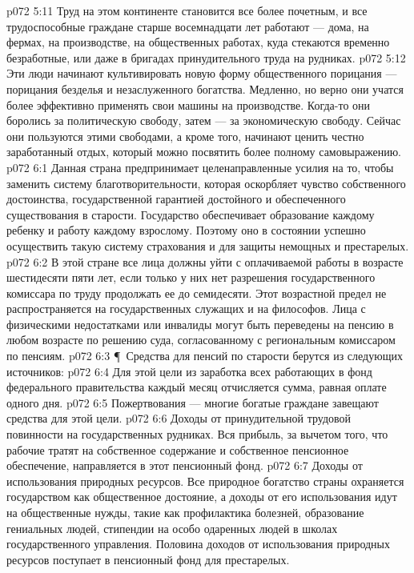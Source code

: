 \vs p072 5:11 Труд на этом континенте становится все более почетным, и все трудоспособные граждане старше восемнадцати лет работают --- дома, на фермах, на производстве, на общественных работах, куда стекаются временно безработные, или даже в бригадах принудительного труда на рудниках.
\vs p072 5:12 Эти люди начинают культивировать новую форму общественного порицания --- порицания безделья и незаслуженного богатства. Медленно, но верно они учатся более эффективно применять свои машины на производстве. Когда\hyp{}то они боролись за политическую свободу, затем --- за экономическую свободу. Сейчас они пользуются этими свободами, а кроме того, начинают ценить честно заработанный отдых, который можно посвятить более полному самовыражению.
\vs p072 6:1 Данная страна предпринимает целенаправленные усилия на то, чтобы заменить систему благотворительности, которая оскорбляет чувство собственного достоинства, государственной гарантией достойного и обеспеченного существования в старости. Государство обеспечивает образование каждому ребенку и работу каждому взрослому. Поэтому оно в состоянии успешно осуществить такую систему страхования и для защиты немощных и престарелых.
\vs p072 6:2 В этой стране все лица должны уйти с оплачиваемой работы в возрасте шестидесяти пяти лет, если только у них нет разрешения государственного комиссара по труду продолжать ее до семидесяти. Этот возрастной предел не распространяется на государственных служащих и на философов. Лица с физическими недостатками или инвалиды могут быть переведены на пенсию в любом возрасте по решению суда, согласованному с региональным комиссаром по пенсиям.
\vs p072 6:3 \P\ Средства для пенсий по старости берутся из следующих источников:
\vs p072 6:4 \bibnobreakspace Для этой цели из заработка всех работающих в фонд федерального правительства каждый месяц отчисляется сумма, равная оплате одного дня.
\vs p072 6:5 \bibnobreakspace Пожертвования --- многие богатые граждане завещают средства для этой цели.
\vs p072 6:6 \bibnobreakspace Доходы от принудительной трудовой повинности на государственных рудниках. Вся прибыль, за вычетом того, что рабочие тратят на собственное содержание и собственное пенсионное обеспечение, направляется в этот пенсионный фонд.
\vs p072 6:7 \bibnobreakspace Доходы от использования природных ресурсов. Все природное богатство страны охраняется государством как общественное достояние, а доходы от его использования идут на общественные нужды, такие как профилактика болезней, образование гениальных людей, стипендии на особо одаренных людей в школах государственного управления. Половина доходов от использования природных ресурсов поступает в пенсионный фонд для престарелых.

